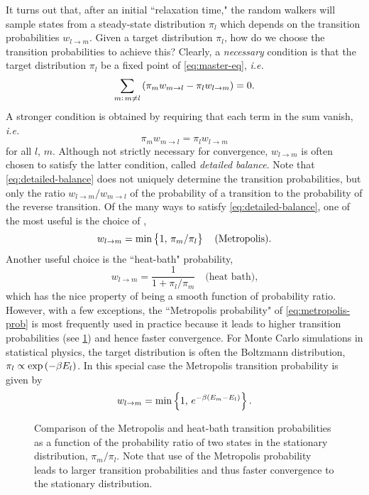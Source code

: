 It turns out that, after an initial ``relaxation time," the random walkers will
sample states from a steady-state distribution $\pi_l$ which depends on the
transition probabilities $w_{l \to m}$. Given a target distribution $\pi_l$,
how do we choose the transition probabilities to achieve this? Clearly, a
\emph{necessary} condition is that the target distribution $\pi_l$ be a fixed
point of \cref{eq:master-eq}, \emph{i.e.}
\begin{equation}
  \sum_{m:\,m \neq l} \left(\pi_m w_{m \to l} - \pi_l w_{l \to m}\right) = 0.
  \label{eq:fixed-point}
\end{equation}
A stronger condition is obtained by requiring that each term in the sum vanish,
\emph{i.e.}
\begin{equation}
  \pi_m w_{m \to l} = \pi_l w_{l \to m}
  \label{eq:detailed-balance}
\end{equation}
for all $l$, $m$. Although not strictly necessary for convergence, $w_{l \to
  m}$ is often chosen to satisfy the latter condition, called \emph{detailed
  balance}. Note that \cref{eq:detailed-balance} does not uniquely determine
the transition probabilities, but only the ratio $w_{l \to m}/w_{m \to l}$ of
the probability of a transition to the probability of the reverse transition.
Of the many ways to satisfy \cref{eq:detailed-balance}, one of the most useful
is the choice of \textcite{metropolis1953equation},
\begin{equation}
  w_{l \to m} = \min\cbr{1,\, \pi_m/\pi_l}
  \quad\text{(Metropolis).}
  \label{eq:metropolis-prob}
\end{equation}
Another useful choice is the ``heat-bath" probability,
\begin{equation}
  w_{l \to m} = \frac{1}{1 + \pi_l/\pi_m}
  \quad\text{(heat bath),}
\end{equation}
which has the nice property of being a smooth function of probability ratio.
However, with a few exceptions, the ``Metropolis probability" of
\cref{eq:metropolis-prob} is most frequently used in practice because it leads
to higher transition probabilities (see \cref{fig:metropolis-vs-heatbath}) and
hence faster convergence. For Monte Carlo simulations in statistical physics,
the target distribution is often the Boltzmann distribution, $\pi_l \propto
\exp\left(-\beta E_l\right)$. In this special case the Metropolis transition
probability is given by
\begin{equation}
  w_{l \to m} = \min\cbr{1,\,e^{-\beta (E_m - E_l)}}.
\end{equation}
\begin{figure}
  \centering
  
  \caption[
    Comparison of the Metropolis and heat-bath transition probabilities as a
    function of the probability ratio of two states in the target distribution.
  ]
  {
    Comparison of the Metropolis and heat-bath transition probabilities as a
    function of the probability ratio of two states in the stationary
    distribution, $\pi_m/\pi_l$. Note that use of the Metropolis probability
    leads to larger transition probabilities and thus faster convergence to the
    stationary distribution.
  }
  \label{fig:metropolis-vs-heatbath}
\end{figure}


